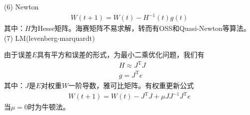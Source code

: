             (6) Newton
            \begin{align*}
            W(t+1) = W(t) - H^{-1}(t)g(t)
            \end{align*}
            其中：$H$为Hesse矩阵。海赛矩阵不易求解，转而有OSS和Quasi-Newton等算法。\\
            (7) LM(levenberg-marquardt)
            \par
            由于误差$E$具有平方和误差的形式，为最小二乘优化问题，我们有
            \begin{align*}
            & H \approx J^\mathrm{T}J\\
            & g = J^\mathrm{T}e
            \end{align*}
            其中：$J$是$E$对权重$W$一阶导数，雅可比矩阵。有权重更新公式
            \begin{align*}
            W(t+1) = W(t) - J^\mathrm{T}J +\mu JJ^{-1}J^\mathrm{T}e
            \end{align*}
            当$\mu=0$时为牛顿法。

